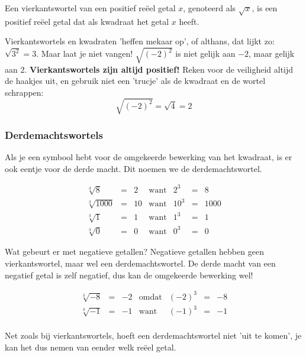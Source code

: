 \begin{definitie}
	Een vierkantswortel van een positief re\"eel getal $x$, genoteerd als $\sqrt{x}$, is een positief re\"eel getal dat als kwadraat het getal $x$ heeft.
\end{definitie}

Vierkantswortels en kwadraten 'heffen mekaar op', of althans, dat lijkt zo: $\sqrt{3^2}=3$. Maar laat je niet vangen! $\sqrt{(-2)^2}$ is niet gelijk aan $-2$, maar gelijk aan $2$. \textbf{Vierkantswortels zijn altijd positief!} Reken voor de veiligheid altijd de haakjes uit, en gebruik niet een 'trucje' als de kwadraat en de wortel schrappen:
\begin{equation*}
\sqrt{(-2)^2}=\sqrt{4}=2
\end{equation*}

\subsubsection{Derdemachtswortels}

Als je een symbool hebt voor de omgekeerde bewerking van het kwadraat, is er ook eentje voor de derde macht. Dit noemen we de derdemachtswortel.

\begin{equation*}
\begin{array}{ccccccc}
\sqrt[3]{8} &=& 2 & \text{want} & 2^3 &=& 8 \\
\sqrt[3]{1000} &=& 10 & \text{want} & 10^3 &=& 1000 \\
\sqrt[3]{1} &=& 1 & \text{want} & 1^3 &=& 1 \\
\sqrt[3]{0} &=& 0 & \text{want} & 0^3 &=& 0 
\end{array}
\end{equation*}


Wat gebeurt er met negatieve getallen? Negatieve getallen hebben geen vierkantswortel, maar wel een derdemachtswortel. 
De derde macht van een negatief getal is zelf negatief, dus kan de omgekeerde bewerking wel!

\begin{equation*}
\begin{array}{ccccccc}
\sqrt[3]{-8} &=& -2 & \text{omdat} & (-2)^3 &=& -8 \\
\sqrt[3]{-1} &=& -1 & \text{want} & (-1)^3 &=& -1 \\
\end{array}
\end{equation*}

Net zoals bij vierkantswortels, hoeft een derdemachtswortel niet 'uit te komen', je kan het dus nemen van eender welk re\"eel getal.

